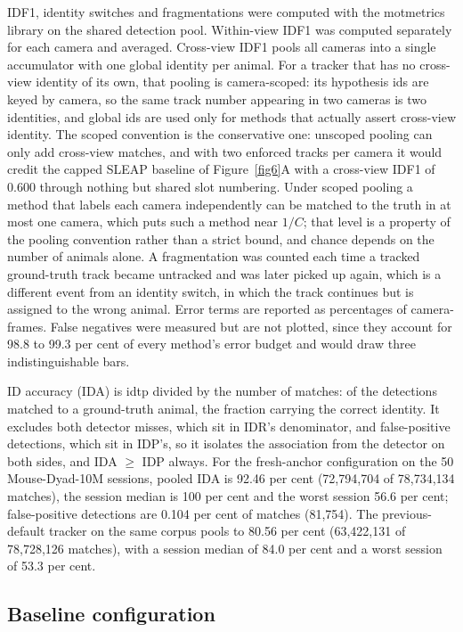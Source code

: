 \documentclass[pdflatex, sn-nature]{sn-jnl}
\theoremstyle{thmstyleone}%
\theoremstyle{thmstyletwo}%
\theoremstyle{thmstylethree}%
\begin{document}
IDF1, identity switches and fragmentations were computed with the motmetrics library on the shared detection pool. Within-view IDF1 was computed separately for each camera and averaged. Cross-view IDF1 pools all cameras into a single accumulator with one global identity per animal. For a tracker that has no cross-view identity of its own, that pooling is camera-scoped: its hypothesis ids are keyed by camera, so the same track number appearing in two cameras is two identities, and global ids are used only for methods that actually assert cross-view identity. The scoped convention is the conservative one: unscoped pooling can only add cross-view matches, and with two enforced tracks per camera it would credit the capped SLEAP baseline of Figure~\ref{fig6}A with a cross-view IDF1 of 0.600 through nothing but shared slot numbering. Under scoped pooling a method that labels each camera independently can be matched to the truth in at most one camera, which puts such a method near $1/C$; that level is a property of the pooling convention rather than a strict bound, and chance depends on the number of animals alone. A fragmentation was counted each time a tracked ground-truth track became untracked and was later picked up again, which is a different event from an identity switch, in which the track continues but is assigned to the wrong animal. Error terms are reported as percentages of camera-frames. False negatives were measured but are not plotted, since they account for 98.8 to 99.3 per cent of every method's error budget and would draw three indistinguishable bars.

ID accuracy (IDA) is idtp divided by the number of matches: of the detections matched to a ground-truth animal, the fraction carrying the correct identity. It excludes both detector misses, which sit in IDR's denominator, and false-positive detections, which sit in IDP's, so it isolates the association from the detector on both sides, and IDA $\geq$ IDP always. For the fresh-anchor configuration on the 50 Mouse-Dyad-10M sessions, pooled IDA is 92.46 per cent (72,794,704 of 78,734,134 matches), the session median is 100 per cent and the worst session 56.6 per cent; false-positive detections are 0.104 per cent of matches (81,754). The previous-default tracker on the same corpus pools to 80.56 per cent (63,422,131 of 78,728,126 matches), with a session median of 84.0 per cent and a worst session of 53.3 per cent.

\subsection{Baseline configuration}\label{methods-baseline}
\end{document}
